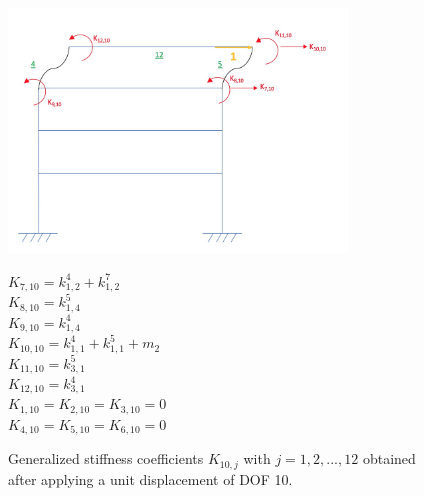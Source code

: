 \documentclass[11pt,a4paper,titlepage]{report}
\begin{document}
\begin{figure} [h]
\begin{minipage}{0.59\linewidth}
        \centering
         \includegraphics[width=9cm]{U=10.jpeg}
\end{minipage}
\begin{minipage}{0.4\linewidth}
\begin{small}
$K_{7,10} = k^4_{1,2}+k^7_{1,2}$\\
$K_{8,10} = k^5_{1,4}$\\
$K_{9,10} = k^4_{1,4}$\\
$K_{10,10} = k^4_{1,1}+k^5_{1,1}+m_2$\\
$K_{11,10} = k^5_{3,1}$\\
$K_{12,10} = k^4_{3,1}$\\
$K_{1,10} = K_{2,10} = K_{3,10} =0$\\
$K_{4,10} = K_{5,10} = K_{6,10} =0$\\
\end{small}
\end{minipage}
\caption{Generalized stiffness coefficients $K_{10,j}$ with $j=1,2,...,12$ obtained after applying a unit displacement of DOF 10.}
\label{fig: I.1 - u10=1}
\end{figure}
\newpage
\end{document}
